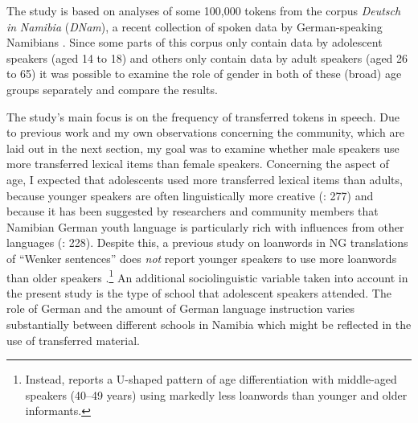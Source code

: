 \documentclass[output=paper]{langsci/langscibook}
\begin{document}
The study is based on analyses of some 100,000 tokens from the corpus \textit{Deutsch} \textit{in} \textit{Namibia} (\textit{DNam}), a recent collection of spoken data by German-speaking Namibians \citep{zimmer_korpus_2020}. Since some parts of this corpus only contain data by adolescent speakers (aged 14 to 18) and others only contain data by adult speakers (aged 26 to 65) it was possible to examine the role of gender in both of these (broad) age groups separately and compare the results.

The study’s main focus is on the frequency of transferred tokens in speech. Due to previous work and my own observations concerning the community, which are laid out in the next section, my goal was to examine whether male speakers use more transferred lexical items than female speakers. Concerning the aspect of age, I expected that adolescents used more transferred lexical items than adults, because younger speakers are often linguistically more creative (\citealt{wiese_deutsch_2014}: 277) and because it has been suggested by researchers and community members that Namibian German youth language is particularly rich with influences from other languages (\citealt{kellermeier-rehbein_sprache_2016}: 228). Despite this, a previous study on loanwords in NG translations of “Wenker sentences” does \textit{not} report younger speakers to use more loanwords than older speakers \citep{zimmer_linguisticvar_toappear}.\footnote{Instead, \citep{zimmer_linguisticvar_toappear} reports a U-shaped pattern of age differentiation with middle-aged speakers (40--49 years) using markedly less loanwords than younger and older informants.} An additional sociolinguistic variable taken into account in the present study is the type of school that adolescent speakers attended. The role of German and the amount of German language instruction varies substantially between different schools in Namibia which might be reflected in the use of transferred material.
\end{document}
